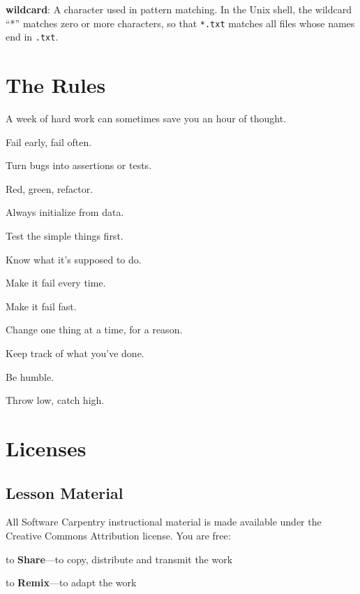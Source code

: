 \documentclass{book}
\begin{document}
\textbf{wildcard}: A character used in pattern matching. In the Unix
shell, the wildcard ``*'' matches zero or more characters, so that
\texttt{*.txt} matches all files whose names end in \texttt{.txt}.

\chapter{The Rules}\label{s:rules}

\begin{swcitemize}
\item
  A week of hard work can sometimes save you an hour of thought.
\item
  Fail early, fail often.
\item
  Turn bugs into assertions or tests.
\item
  Red, green, refactor.
\item
  Always initialize from data.
\item
  Test the simple things first.
\item
  Know what it's supposed to do.
\item
  Make it fail every time.
\item
  Make it fail fast.
\item
  Change one thing at a time, for a reason.
\item
  Keep track of what you've done.
\item
  Be humble.
\item
  Throw low, catch high.
\end{swcitemize}

\chapter{Licenses}\label{s:license}

\section{Lesson Material}

All Software Carpentry instructional material is made available under
the Creative Commons Attribution license. You are free:

\begin{swcitemize}
\item
  to \textbf{Share}---to copy, distribute and transmit the work
\item
  to \textbf{Remix}---to adapt the work
\end{swcitemize}
\end{document}
